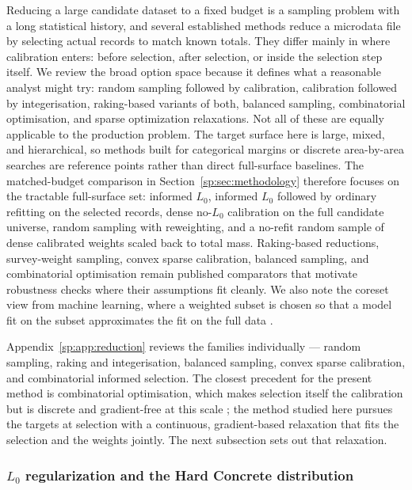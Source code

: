 Reducing a large candidate dataset to a fixed budget is a sampling problem with a long statistical
history, and several established methods reduce a microdata file by selecting actual records to match
known totals. They differ mainly in where calibration enters: before selection, after selection, or
inside the selection step itself. We review the broad option space because it defines what a reasonable
analyst might try: random sampling followed by calibration, calibration followed by integerisation,
raking-based variants of both, balanced sampling, combinatorial optimisation, and sparse optimization
relaxations. Not all of these are equally applicable to the production problem. The target surface here
is large, mixed, and hierarchical, so methods built for categorical margins or discrete area-by-area
searches are reference points rather than direct full-surface baselines. The matched-budget comparison
in Section~\ref{sp:sec:methodology} therefore focuses on the tractable full-surface set: informed $L_0$,
informed $L_0$ followed by ordinary refitting on the selected records, dense no-$L_0$ calibration on the
full candidate universe, random sampling with reweighting, and a no-refit random sample of dense
calibrated weights scaled back to total mass. Raking-based reductions, survey-weight sampling, convex
sparse calibration, balanced sampling, and combinatorial optimisation remain published comparators that
motivate robustness checks where their assumptions fit cleanly. We also note the coreset view from
machine learning, where a weighted subset is chosen so that a model fit on the subset approximates the
fit on the full data \citep{feldman2020coresets, bachem2017coresets}.

Appendix~\ref{sp:app:reduction} reviews the families individually --- random sampling,
raking and integerisation, balanced sampling, convex sparse calibration, and combinatorial informed
selection. The closest precedent for the present method is combinatorial optimisation, which makes
selection itself the calibration but is discrete and gradient-free at this scale
\citep{williamson1998, voas2000}; the method studied here pursues the targets at selection with a
continuous, gradient-based relaxation that fits the selection and the weights jointly. The next
subsection sets out that relaxation.

\subsubsection{\texorpdfstring{$L_0$}{L0} regularization and the Hard Concrete distribution}

